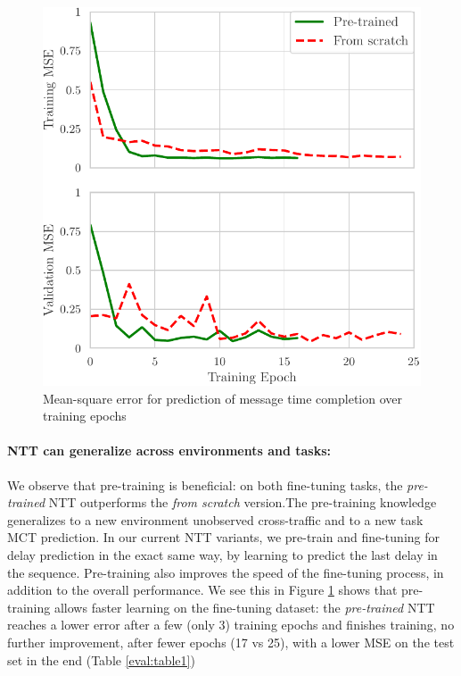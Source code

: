 \begin{figure}[!h]
  \begin{center}
    \includegraphics[scale=1]{figures/MCT_loss.pdf}
    \caption{Mean-square error for prediction of message
time completion over training epochs}
    \label{fig:loss_mct}
  \end{center}
\end{figure}

\vspace{-1cm}

\paragraph*{NTT can generalize across environments and tasks:}

We observe that pre-training is beneficial: on both fine-tuning tasks, the \emph{pre-trained} NTT outperforms the \emph{from scratch} version.The pre-training knowledge generalizes to a new environment \ie unobserved cross-traffic and to a new task \ie MCT prediction. In our current NTT variants, we pre-train and fine-tuning for delay prediction in the exact same way, by learning to predict the last delay in the sequence. Pre-training also improves the speed of the fine-tuning process, in addition to the overall performance. We see this in Figure \ref{fig:loss_mct} shows that pre-training allows faster learning on the fine-tuning dataset: the \emph{pre-trained} NTT reaches a lower error after a few (only 3) training epochs and finishes training, \ie no further improvement, after fewer epochs (17 vs 25), with a lower MSE on the test set in the end (Table \ref{eval:table1})


